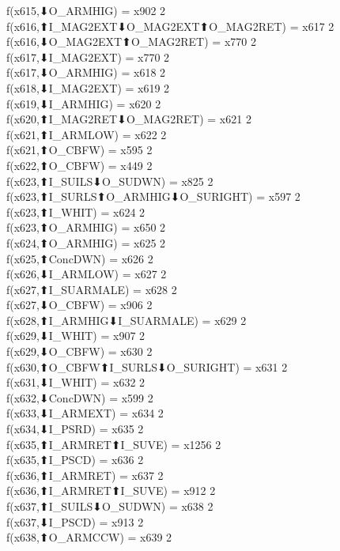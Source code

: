 f(x615,⬇O_ARMHIG) = x902 {2} \\
f(x616,⬆I_MAG2EXT⬇O_MAG2EXT⬆O_MAG2RET) = x617 {2} \\
f(x616,⬇O_MAG2EXT⬆O_MAG2RET) = x770 {2} \\
f(x617,⬇I_MAG2EXT) = x770 {2} \\
f(x617,⬇O_ARMHIG) = x618 {2} \\
f(x618,⬇I_MAG2EXT) = x619 {2} \\
f(x619,⬇I_ARMHIG) = x620 {2} \\
f(x620,⬆I_MAG2RET⬇O_MAG2RET) = x621 {2} \\
f(x621,⬆I_ARMLOW) = x622 {2} \\
f(x621,⬆O_CBFW) = x595 {2} \\
f(x622,⬆O_CBFW) = x449 {2} \\
f(x623,⬆I_SUILS⬇O_SUDWN) = x825 {2} \\
f(x623,⬆I_SURLS⬆O_ARMHIG⬇O_SURIGHT) = x597 {2} \\
f(x623,⬆I_WHIT) = x624 {2} \\
f(x623,⬆O_ARMHIG) = x650 {2} \\
f(x624,⬆O_ARMHIG) = x625 {2} \\
f(x625,⬆ConcDWN) = x626 {2} \\
f(x626,⬇I_ARMLOW) = x627 {2} \\
f(x627,⬆I_SUARMALE) = x628 {2} \\
f(x627,⬇O_CBFW) = x906 {2} \\
f(x628,⬆I_ARMHIG⬇I_SUARMALE) = x629 {2} \\
f(x629,⬇I_WHIT) = x907 {2} \\
f(x629,⬇O_CBFW) = x630 {2} \\
f(x630,⬆O_CBFW⬆I_SURLS⬇O_SURIGHT) = x631 {2} \\
f(x631,⬇I_WHIT) = x632 {2} \\
f(x632,⬇ConcDWN) = x599 {2} \\
f(x633,⬇I_ARMEXT) = x634 {2} \\
f(x634,⬇I_PSRD) = x635 {2} \\
f(x635,⬆I_ARMRET⬆I_SUVE) = x1256 {2} \\
f(x635,⬆I_PSCD) = x636 {2} \\
f(x636,⬆I_ARMRET) = x637 {2} \\
f(x636,⬆I_ARMRET⬆I_SUVE) = x912 {2} \\
f(x637,⬆I_SUILS⬇O_SUDWN) = x638 {2} \\
f(x637,⬇I_PSCD) = x913 {2} \\
f(x638,⬆O_ARMCCW) = x639 {2} \\
